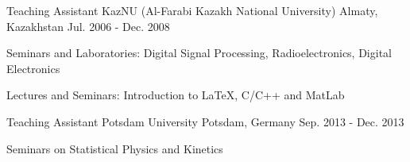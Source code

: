 \begin{cventries}
  \cventry
    {Teaching Assistant}
    {KazNU (Al-Farabi Kazakh National University)}
    {Almaty, Kazakhstan}
    {Jul. 2006 - Dec. 2008}
    {
      \begin{cvitems}
        \item {Seminars and Laboratories: Digital Signal Processing, Radioelectronics, Digital Electronics}
        \item {Lectures and Seminars: Introduction to LaTeX, C/C++ and MatLab}
      \end{cvitems}
    }
  \cventry
    {Teaching Assistant}
    {Potsdam University}
    {Potsdam, Germany}
    {Sep. 2013 - Dec. 2013}
    {
      \begin{cvitems}
        \item {Seminars on Statistical Physics and Kinetics}
      \end{cvitems}
    }
\end{cventries}
